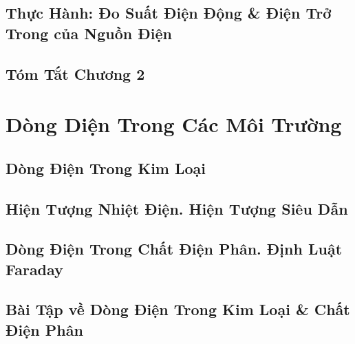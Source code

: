 \documentclass[oneside]{book}
\numberwithin{equation}{section}
\begin{document}

\section{Thực Hành: Đo Suất Điện Động \& Điện Trở Trong của Nguồn Điện}


\section{Tóm Tắt Chương 2}


\chapter{Dòng Diện Trong Các Môi Trường}

\section{Dòng Điện Trong Kim Loại}


\section{Hiện Tượng Nhiệt Điện. Hiện Tượng Siêu Dẫn}


\section{Dòng Điện Trong Chất Điện Phân. Định Luật Faraday}


\section{Bài Tập về Dòng Điện Trong Kim Loại \& Chất Điện Phân}

\end{document}

